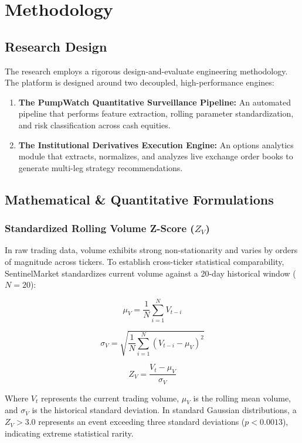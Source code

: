 \chapter{Methodology}

\section{Research Design}
The research employs a rigorous design-and-evaluate engineering methodology. The platform is designed around two decoupled, high-performance engines:
\begin{enumerate}
    \item \textbf{The PumpWatch Quantitative Surveillance Pipeline:} An automated pipeline that performs feature extraction, rolling parameter standardization, and risk classification across cash equities.
    \item \textbf{The Institutional Derivatives Execution Engine:} An options analytics module that extracts, normalizes, and analyzes live exchange order books to generate multi-leg strategy recommendations.
\end{enumerate}

\section{Mathematical & Quantitative Formulations}

\subsection{Standardized Rolling Volume Z-Score ($Z_V$)}
In raw trading data, volume exhibits strong non-stationarity and varies by orders of magnitude across tickers. To establish cross-ticker statistical comparability, SentinelMarket standardizes current volume against a 20-day historical window ($N=20$):

\begin{equation}
\mu_V = \frac{1}{N} \sum_{i=1}^{N} V_{t-i}
\end{equation}

\begin{equation}
\sigma_V = \sqrt{\frac{1}{N} \sum_{i=1}^{N} (V_{t-i} - \mu_V)^2}
\end{equation}

\begin{equation}
Z_V = \frac{V_t - \mu_V}{\sigma_V}
\end{equation}

Where $V_t$ represents the current trading volume, $\mu_V$ is the rolling mean volume, and $\sigma_V$ is the historical standard deviation. In standard Gaussian distributions, a $Z_V > 3.0$ represents an event exceeding three standard deviations ($p < 0.0013$), indicating extreme statistical rarity.

